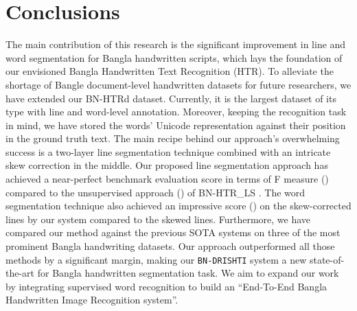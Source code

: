 \documentclass[runningheads]{llncs}
\begin{document}
\section{Conclusions}
\vspace{-1mm}
The main contribution of this research is the significant improvement in line and word segmentation for Bangla handwritten scripts, which lays the foundation of our envisioned Bangla Handwritten Text Recognition (HTR). To alleviate the shortage of Bangle document-level handwritten datasets for future researchers, we have extended our BN-HTRd dataset. Currently, it is the largest dataset of its type with line and word-level annotation. Moreover, keeping the recognition task in mind, we have stored the words' Unicode representation against their position in the ground truth text. The main recipe behind our approach's overwhelming success is a two-layer line segmentation technique combined with an intricate skew correction in the middle. Our proposed line segmentation approach has achieved a near-perfect benchmark evaluation score in terms of F measure () compared to the unsupervised approach () of BN-HTR\_LS \cite{rahman2023bn}. The word segmentation technique also achieved an impressive score () on the skew-corrected lines by our system compared to the skewed lines. Furthermore, we have compared our method against the previous SOTA systems on three of the most prominent Bangla handwriting datasets. Our approach outperformed all those methods by a significant margin, making our \texttt{BN-DRISHTI} system a new state-of-the-art for Bangla handwritten segmentation task. We aim to expand our work by integrating supervised word recognition to build an “End-To-End Bangla Handwritten Image Recognition system”.





\end{document}
